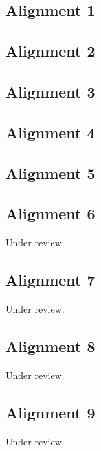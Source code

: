 \documentclass{scrartcl}
\begin{document}
\subsection{Alignment 1}
\label{sec:align_1}
\clearpage

\subsection{Alignment 2}
\label{sec:align_2}
\clearpage

\subsection{Alignment 3}
\label{sec:align_3}
\clearpage

\subsection{Alignment 4}
\label{sec:align_4}
\clearpage

\subsection{Alignment 5}
\label{sec:align_5}
\clearpage

\subsection{Alignment 6}
\label{sec:align_6}
Under review.%
\clearpage

\subsection{Alignment 7}
\label{sec:align_7}
Under review.%
\clearpage

\subsection{Alignment 8}
\label{sec:align_8}
Under review.%
\clearpage

\subsection{Alignment 9}
\label{sec:align_9}
Under review.%
\clearpage
\end{document}
